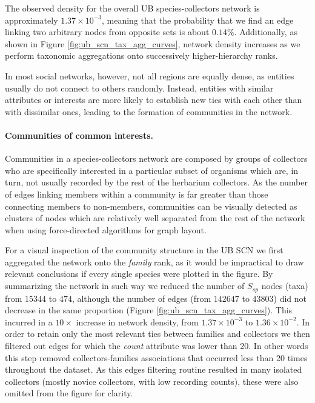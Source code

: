 The observed density for the overall UB species-collectors network is approximately $1.37 \times 10^{-3}$, meaning that the probability that we find an edge linking two arbitrary nodes from opposite sets is about $0.14\%$. Additionally, as shown in Figure \ref{fig:ub_scn_tax_agg_curves}, network density increases as we perform taxonomic aggregations onto successively higher-hierarchy ranks.

In most social networks, however, not all regions are equally dense, as entities usually do not connect to others randomly. Instead, entities with similar attributes or interests are more likely to establish new ties with each other than with dissimilar ones, leading to the formation of communities in the network.


\paragraph*{Communities of common interests.}
Communities in a species-collectors network are composed by groups of collectors who are specifically interested in a particular subset of organisms which are, in turn, not usually recorded by the rest of the herbarium collectors. As the number of edges linking members within a community is far greater than those connecting members to non-members, communities can be visually detected as clusters of nodes which are relatively well separated from the rest of the network when using force-directed algorithms \cite{Jacomy2014} for graph layout.

For a visual inspection of the community structure in the UB SCN we first aggregated the network onto the \textit{family} rank, as it would be impractical to draw relevant conclusions if every single species were plotted in the figure. By summarizing the network in such way we reduced the number of $S_{sp}$ nodes (taxa) from $15344$ to $474$, although the number of edges (from $142647$ to $43803$) did not decrease in the same proportion (Figure \ref{fig:ub_scn_tax_agg_curves}).
This incurred in a $10 \times$ increase in network density, from $1.37\times 10^{-3}$ to $1.36\times 10^{-2}$.
In order to retain only the most relevant ties between families and collectors we then filtered out edges for which the \textit{count} attribute was lower than 20. In other words this step removed collectors-families associations that occurred less than 20 times throughout the dataset. As this edges filtering routine resulted in many isolated collectors (mostly novice collectors, with low recording counts), these were also omitted from the figure for clarity.

